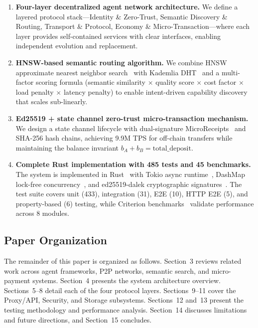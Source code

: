 \begin{enumerate}[label=\textbf{C\arabic*.}]
  \item \textbf{Four-layer decentralized agent network architecture.} We define a layered protocol stack---Identity \& Zero-Trust, Semantic Discovery \& Routing, Transport \& Protocol, Economy \& Micro-Transaction---where each layer provides self-contained services with clear interfaces, enabling independent evolution and replacement.

  \item \textbf{HNSW-based semantic routing algorithm.} We combine HNSW approximate nearest neighbor search~\cite{malkov2018hnsw} with Kademlia DHT~\cite{maymounkov2002kademlia} and a multi-factor scoring formula (semantic similarity $\times$ quality score $\times$ cost factor $\times$ load penalty $\times$ latency penalty) to enable intent-driven capability discovery that scales sub-linearly.

  \item \textbf{Ed25519 + state channel zero-trust micro-transaction mechanism.} We design a state channel lifecycle with dual-signature MicroReceipts~\cite{lightning2016} and SHA-256 hash chains, achieving 9.9M TPS for off-chain transfers while maintaining the balance invariant $b_A + b_B = \text{total\_deposit}$.

  \item \textbf{Complete Rust implementation with 485 tests and 45 benchmarks.} The system is implemented in Rust~\cite{rust2010} with Tokio async runtime~\cite{tokio2022}, DashMap lock-free concurrency~\cite{dashmap2022}, and ed25519-dalek cryptographic signatures~\cite{ed25519dalek2022}. The test suite covers unit (433), integration (31), E2E (10), HTTP E2E (5), and property-based (6) testing, while Criterion benchmarks~\cite{criterion2022} validate performance across 8 modules.
\end{enumerate}

\subsection{Paper Organization}

The remainder of this paper is organized as follows. Section~3 reviews related work across agent frameworks, P2P networks, semantic search, and micro-payment systems. Section~4 presents the system architecture overview. Sections~5--8 detail each of the four protocol layers. Sections~9--11 cover the Proxy/API, Security, and Storage subsystems. Sections~12 and~13 present the testing methodology and performance analysis. Section~14 discusses limitations and future directions, and Section~15 concludes.
